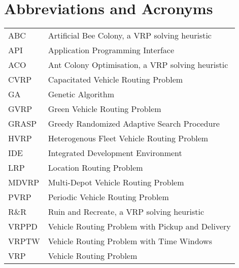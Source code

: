 \chapter*{Abbreviations and Acronyms}


\noindent
\begin{longtable}{@{}p{}p{}@{}}

ABC & Artificial Bee Colony, a VRP solving heuristic \\
API & Application Programming Interface \\
ACO & Ant Colony Optimisation, a VRP solving heuristic \\ 
CVRP & Capacitated Vehicle Routing Problem \\
GA & Genetic Algorithm \\
GVRP & Green Vehicle Routing Problem \\
GRASP & Greedy Randomized Adaptive Search Procedure \\
HVRP & Heterogenous Fleet Vehicle Routing Problem \\
IDE & Integrated Development Environment \\
LRP & Location Routing Problem \\
MDVRP & Multi-Depot Vehicle Routing Problem \\
PVRP & Periodic Vehicle Routing Problem \\
R\&R & Ruin and Recreate, a VRP solving heuristic \\
VRPPD & Vehicle Routing Problem with Pickup and Delivery \\
VRPTW & Vehicle Routing Problem with Time Windows \\
VRP & Vehicle Routing Problem \\ 

\end{longtable}
